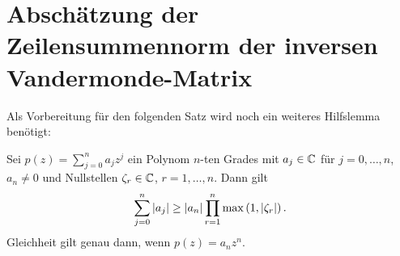 \section{Abschätzung der Zeilensummennorm der inversen Vandermonde-Matrix}

Als Vorbereitung für den folgenden Satz wird noch ein weiteres Hilfslemma benötigt:

\begin{lemma}
    \label{lemma:polynom_coefficient_sum_inequality}
    Sei $p(z) = \sum_{j = 0}^{n} a_j z^j$ ein Polynom $n$-ten Grades mit
    $a_j \in \mathbb{C}$ für $j = 0, \dots, n$, $a_n \neq 0$ und Nullstellen
    $\zeta_r \in \mathbb{C}$, $r = 1, \dots, n$.
    Dann gilt
    \begin{equation}
        \label{eq:polynom_coefficient_sum_inequality}
        \sum_{j=0}^{n} \left\lvert a_j \right\rvert \geq \left\lvert a_n \right\rvert \prod_{r=1}^{n} \max \left(1, \left\lvert \zeta_r \right\rvert \right).
    \end{equation}
    Gleichheit gilt genau dann, wenn $p(z) = a_n z^n$.
\end{lemma}

